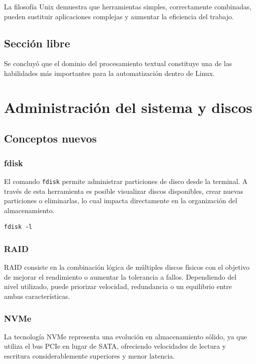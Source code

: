 \documentclass[11pt, letterpaper]{article}
\begin{document}
La filosofía Unix demuestra que herramientas simples, correctamente
combinadas, pueden sustituir aplicaciones complejas y aumentar la
eficiencia del trabajo.
\subsection{Sección libre}
\label{sec:orge98094c}

Se concluyó que el dominio del procesamiento textual constituye una de
las habilidades más importantes para la automatización dentro de Linux.
\section{Administración del sistema y discos}
\label{sec:orgf277edf}

\subsection{Conceptos nuevos}
\label{sec:org185cdf7}

\subsubsection{fdisk}
\label{sec:orgd95c165}

El comando \texttt{fdisk} permite administrar particiones de disco desde la
terminal. A través de esta herramienta es posible visualizar discos
disponibles, crear nuevas particiones o eliminarlas, lo cual impacta
directamente en la organización del almacenamiento.

\begin{verbatim}
fdisk -l
\end{verbatim}
\subsubsection{RAID}
\label{sec:org44a58e7}

RAID consiste en la combinación lógica de múltiples discos físicos con
el objetivo de mejorar el rendimiento o aumentar la tolerancia a fallos.
Dependiendo del nivel utilizado, puede priorizar velocidad,
redundancia o un equilibrio entre ambas características.
\subsubsection{NVMe}
\label{sec:org576c06e}

La tecnología NVMe representa una evolución en almacenamiento sólido,
ya que utiliza el bus PCIe en lugar de SATA, ofreciendo velocidades de
lectura y escritura considerablemente superiores y menor latencia.
\end{document}
